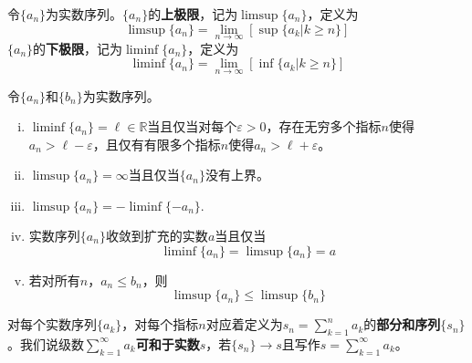 \documentclass[lang=cn,newtx,10pt,scheme=chinese]{elegantbook}
\begin{document}
\begin{definition}[实数序列的上下极限]\label{definition:实数序列的上下极限}
  令\(\{a_n\}\)为实数序列。\(\{a_n\}\)的\textbf{上极限}，记为\(\limsup\{a_n\}\)，定义为
\[\limsup\{a_n\}=\lim_{n \to \infty}[\sup\{a_k|k \geqslant n\}]\]
\(\{a_n\}\)的\textbf{下极限}，记为\(\liminf\{a_n\}\)，定义为
\[\liminf\{a_n\}=\lim_{n \to \infty}[\inf\{a_k|k \geqslant n\}]\]
\end{definition}
  
\begin{proposition}[实数序列的上下极限的等价命题]\label{definition:实数序列的上下极限的等价命题}
  令\(\{a_n\}\)和\(\{b_n\}\)为实数序列。
\begin{enumerate}[(i)]
  \item  \(\liminf\{a_n\}=\ell\in\mathbb{R}\)当且仅当对每个\(\varepsilon>0\)，存在无穷多个指标\(n\)使得\(a_n>\ell - \varepsilon\)，且仅有有限多个指标\(n\)使得\(a_n>\ell+\varepsilon\)。

  \item \(\limsup\{a_n\}=\infty\)当且仅当\(\{a_n\}\)没有上界。

  \item \(\limsup\{a_n\}=-\liminf\{-a_n\}.\)

  \item 实数序列\(\{a_n\}\)收敛到扩充的实数\(a\)当且仅当
\[\liminf\{a_n\}=\limsup\{a_n\}=a\]

  \item 若对所有\(n\)，\(a_n\leqslant b_n\)，则
\[\limsup\{a_n\}\leqslant\limsup\{b_n\}\]
\end{enumerate}
\end{proposition}

\begin{definition}[级数的部分和与可和]\label{definition:级数的部分和与可和}
  对每个实数序列\(\{a_k\}\)，对每个指标\(n\)对应着定义为\(s_n = \sum_{k = 1}^{n}a_k\)的\textbf{部分和序列}\(\{s_n\}\)。我们说级数\(\sum_{k = 1}^{\infty}a_k\)\textbf{可和于实数\(s\)}，若\(\{s_n\}\to s\)且写作\(s = \sum_{k = 1}^{\infty}a_k\)。
\end{definition}
\end{document}
